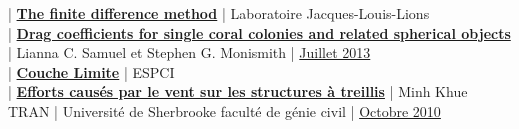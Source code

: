 \documentclass{article}
\newcommand{\htab} {\hspace{1cm}}
\begin{document}
\htab {\LARGE $[$ 6 $]$} | \underline{\textbf{The finite difference method}} | Laboratoire Jacques-Louis-Lions \\

\htab {\LARGE $[$ 7 $]$} | \underline{\textbf{Drag coefficients for single coral colonies and related spherical objects}} | Lianna C. Samuel {\small et} Stephen G. Monismith | \underline{Juillet 2013} \\

\htab {\LARGE $[$ 8 $]$} | \underline{\textbf{Couche Limite}} | ESPCI \\

\htab {\LARGE $[$ 9 $]$} | \underline{\textbf{Efforts causés par le vent sur les structures à treillis}} | Minh Khue TRAN | Université de Sherbrooke faculté de génie civil | \underline{Octobre 2010} \\
\end{document}
